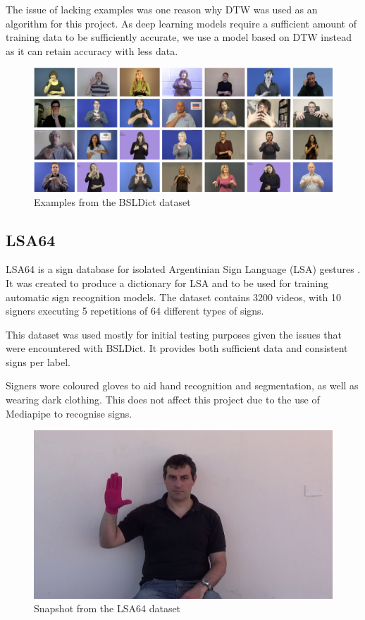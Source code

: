 \documentclass[final,rdr32.tex]{subfiles}
\begin{document}
The issue of lacking examples was one reason why DTW was used as an algorithm for this project. As deep learning models require a sufficient amount of training data to be sufficiently accurate, we use a model based on DTW instead as it can retain accuracy with less data.

\begin{figure}[H]
    \begin{center}
        \includegraphics[scale=0.08]{images/BSLDict.jpeg}
        \caption[caption]{Examples from the BSLDict dataset}
    \end{center}
\end{figure}

\subsection*{LSA64}

LSA64 is a sign database for isolated Argentinian Sign Language (LSA) gestures \cite{ronchetti2016lsa64}. It was created to produce a dictionary for LSA and to be used for training automatic sign recognition models. The dataset contains 3200 videos, with 10 signers executing 5 repetitions of 64 different types of signs.

This dataset was used mostly for initial testing purposes given the issues that were encountered with BSLDict. It provides both sufficient data and consistent signs per label.

Signers wore coloured gloves to aid hand recognition and segmentation, as well as wearing dark clothing. This does not affect this project due to the use of Mediapipe to recognise signs.


\begin{figure}[H]
    \begin{center}
        \includegraphics[scale=0.2]{images/LSA64.png}
        \caption[caption]{Snapshot from the LSA64 dataset}
    \end{center}
\end{figure}
\end{document}
